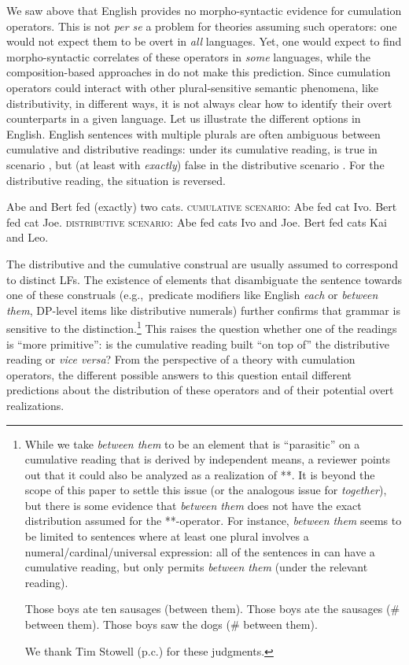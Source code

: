 \documentclass[output=paper]{langscibook}
\begin{document}
We saw above that English provides no morpho-syntactic evidence for cumulation operators. This is not \textit{per se} a problem for theories assuming such operators: one would not expect them to be overt in \textit{all} languages. Yet, one would expect to find morpho-syntactic correlates of these operators in \textit{some} languages, while the composition-based approaches in  do not make this prediction. 
Since cumulation operators could interact with other plural-sensitive semantic phenomena, like distributivity, in different ways, it is not always clear how to identify their overt counterparts in a given language. Let us illustrate the different options in English. English sentences with multiple plurals are often ambiguous between cumulative and distributive readings: under its cumulative reading,  is true in scenario , but (at least with \textit{exactly}) false in the distributive scenario . For the distributive reading, the situation is reversed.

\ea \label{has-sch:11} Abe and Bert fed (exactly) two cats.
\ea \label{has-sch:11a} \textsc{cumulative scenario:} Abe fed cat Ivo. Bert fed cat Joe.
\ex \label{has-sch:11b} \textsc{distributive scenario:} Abe fed cats Ivo and Joe. Bert fed cats Kai and Leo. \z
\z

\noindent The distributive and the cumulative construal are usually assumed to correspond to distinct LFs. The existence of elements that disambiguate the sentence towards one of these construals (e.g.,~predicate modifiers like English \textit{each} or \textit{between them}, DP-level items like distributive numerals) further confirms that grammar is sensitive to the distinction.\footnote{While we take \textit{between them} to be an element that is ``parasitic'' on a cumulative reading that is derived by independent means, a reviewer points out that it could also be analyzed as a realization of **. It is beyond the scope of this paper to settle this issue (or the analogous issue for \textit{together}), but there is some evidence that \textit{between them} does not have the exact distribution assumed for the **-operator. For instance, \textit{between them} seems to be limited to sentences where at least one plural involves a numeral/cardinal/universal expression: all of the sentences in  can have a cumulative reading, but only  permits \textit{between them} (under the relevant reading). 

\ea \label{has-sch:num}
\ea \label{has-sch:numa} Those boys ate ten sausages (between them).
\ex Those boys ate the sausages ($\#$ between them).
\ex Those boys saw the dogs ($\#$ between them).
\z\z

\noindent We thank Tim Stowell (p.c.) for these judgments.} This raises the question whether one of the readings is ``more primitive'': is the cumulative reading built ``on top of'' the distributive reading or \textit{vice versa}? From the perspective of a theory with cumulation operators, the different possible answers to this question entail different predictions about the distribution of these operators and of their potential overt realizations.
\end{document}
